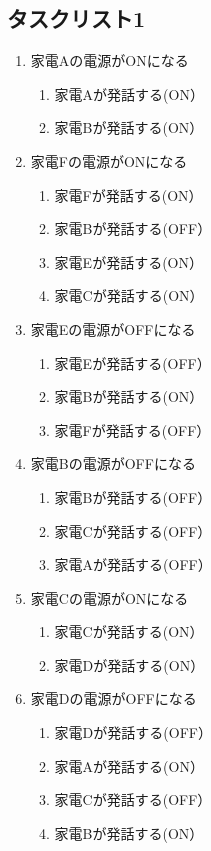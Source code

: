 \documentclass[a4j,12pt,twoside]{jreport}
\begin{document}
\subsection*{タスクリスト1}
\begin{multicols}{2}
	\begin{enumerate}
		\item 家電Aの電源がONになる
		\begin{enumerate}
			\item 家電Aが発話する(ON）
			\item 家電Bが発話する(ON）
		\end{enumerate}

		\item 家電Fの電源がONになる
		\begin{enumerate}
			\item 家電Fが発話する(ON）		
			\item 家電Bが発話する(OFF）
			\item 家電Eが発話する(ON）
			\item 家電Cが発話する(ON）
		\end{enumerate}	
			
		\item 家電Eの電源がOFFになる
		\begin{enumerate}
			\item 家電Eが発話する(OFF）
			\item 家電Bが発話する(ON）
			\item 家電Fが発話する(OFF）
		\end{enumerate}
	
		\item 家電Bの電源がOFFになる
		\begin{enumerate}	
			\item 家電Bが発話する(OFF）	
			\item 家電Cが発話する(OFF）
			\item 家電Aが発話する(OFF）
		\end{enumerate}
		
		\item 家電Cの電源がONになる
		\begin{enumerate}
			\item 家電Cが発話する(ON）	
			\item 家電Dが発話する(ON）
		\end{enumerate}	
		
		\item 家電Dの電源がOFFになる
		\begin{enumerate}
			\item 家電Dが発話する(OFF）
			\item 家電Aが発話する(ON）
			\item 家電Cが発話する(OFF）
			\item 家電Bが発話する(ON）	
		\end{enumerate}	
		

\end{enumerate}
\end{multicols}
\end{document}
